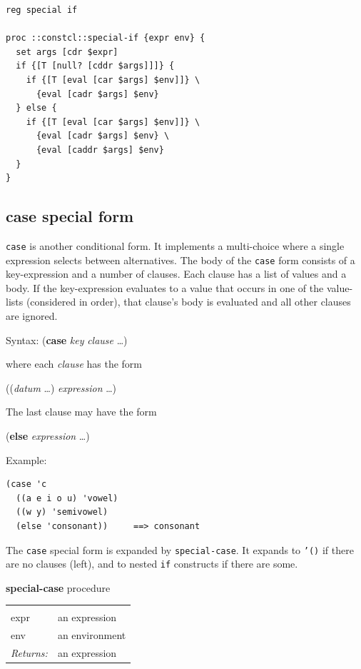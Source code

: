 \documentclass[a5paper,draft]{memoir}
\begin{document}
\begin{lstlisting}
reg special if

proc ::constcl::special-if {expr env} {
  set args [cdr $expr]
  if {[T [null? [cddr $args]]]} {
    if {[T [eval [car $args] $env]]} \
      {eval [cadr $args] $env}
  } else {
    if {[T [eval [car $args] $env]]} \
      {eval [cadr $args] $env} \
      {eval [caddr $args] $env}
  }
}
\end{lstlisting}

\subsection{case special form}
\label{case-special-form}

\texttt{case} is another conditional form. It implements a multi-choice where a single expression selects between alternatives. The body of the \texttt{case} form consists of a key-expression and a number of clauses. Each clause has a list of values and a body. If the key-expression evaluates to a value that occurs in one of the value-lists (considered in order), that clause's body is evaluated and all other clauses are ignored.

Syntax: (\textbf{case} \emph{key} \emph{clause} \ldots )

where each \emph{clause} has the form

((\emph{datum} \ldots ) \emph{expression} \ldots )

The last clause may have the form

(\textbf{else} \emph{expression} \ldots )

Example:

\begin{verbatim}
(case 'c
  ((a e i o u) 'vowel)
  ((w y) 'semivowel)
  (else 'consonant))     ==> consonant
\end{verbatim}

The \texttt{case} special form is expanded by \texttt{special-case}. It expands to \texttt{'()} if there are no clauses (left), and to nested \texttt{if} constructs if there are some.

\textbf{special-case} procedure

\noindent\begin{tabular}{ |p{1.9cm} p{6.5cm}| }
\hline
\rowcolor[HTML]{CCCCCC} \multicolumn{2}{|l|}{\textbf{special-case (internal)}} \\
expr & an expression \\
env & an environment \\
\textit{Returns:} & an expression \\
\hline
\end{tabular}
\end{document}
